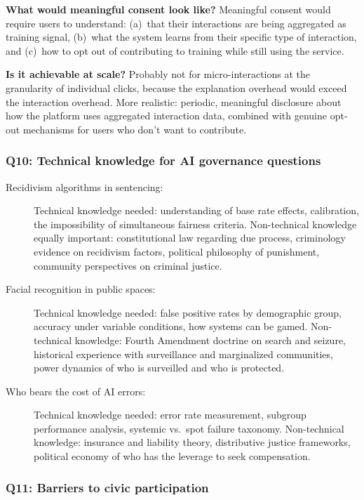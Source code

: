 \textbf{What would meaningful consent look like?} Meaningful consent would require users to understand: (a)~that their interactions are being aggregated as training signal, (b)~what the system learns from their specific type of interaction, and (c)~how to opt out of contributing to training while still using the service.

\textbf{Is it achievable at scale?} Probably not for micro-interactions at the granularity of individual clicks, because the explanation overhead would exceed the interaction overhead. More realistic: periodic, meaningful disclosure about how the platform uses aggregated interaction data, combined with genuine opt-out mechanisms for users who don't want to contribute.

\subsubsection*{Q10: Technical knowledge for AI governance questions}

\begin{description}
    \item[Recidivism algorithms in sentencing:] Technical knowledge needed: understanding of base rate effects, calibration, the impossibility of simultaneous fairness criteria. Non-technical knowledge equally important: constitutional law regarding due process, criminology evidence on recidivism factors, political philosophy of punishment, community perspectives on criminal justice.

    \item[Facial recognition in public spaces:] Technical knowledge needed: false positive rates by demographic group, accuracy under variable conditions, how systems can be gamed. Non-technical knowledge: Fourth Amendment doctrine on search and seizure, historical experience with surveillance and marginalized communities, power dynamics of who is surveilled and who is protected.

    \item[Who bears the cost of AI errors:] Technical knowledge needed: error rate measurement, subgroup performance analysis, systemic vs.\ spot failure taxonomy. Non-technical knowledge: insurance and liability theory, distributive justice frameworks, political economy of who has the leverage to seek compensation.
\end{description}

\subsubsection*{Q11: Barriers to civic participation}

